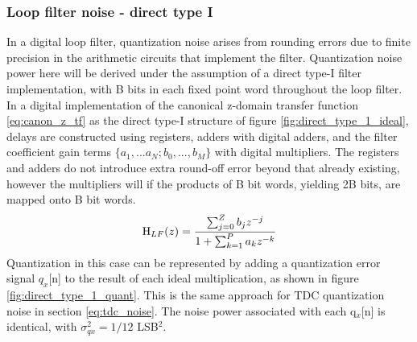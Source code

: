 	\subsubsection{Loop filter noise - direct type I}\label{lf_noise}
		In a digital loop filter, quantization noise arises from rounding errors due to finite precision in the arithmetic circuits that implement the filter. Quantization noise power here will be derived under the assumption of a direct type-I filter implementation, with B bits in each fixed point word throughout the loop filter. In a digital implementation of the canonical z-domain transfer function \ref{eq:canon_z_tf} as the direct type-I structure of figure \ref{fig:direct_type_1_ideal}, delays are constructed using registers, adders with digital adders, and the filter coefficient gain terms $\{a_1, ... a_N; b_0, ..., b_M\}$ with digital multipliers. The registers and adders do not introduce extra round-off error beyond that already existing, however the multipliers will if the products of B bit words, yielding 2B bits, are mapped onto B bit words. 
		\begin{equation}
			\textnormal{H}_{LF}(z) = \frac{\sum_{j=0}^Z b_jz^{-j}}{1+\sum_{k=1}^P a_kz^{-k}}\label{eq:canon_z_tf}
		\end{equation}
		\FloatBarrier
		Quantization in this case can be represented by adding a quantization error signal $q_x$[n] to the result of each ideal multiplication, as shown in figure \ref{fig:direct_type_1_quant}. This is the same approach for TDC quantization noise in section \ref{eq:tdc_noise}. The noise power associated with each q$_x$[n] is identical, with $\sigma_{qx}^2 = 1/12$ LSB$^2$. 

